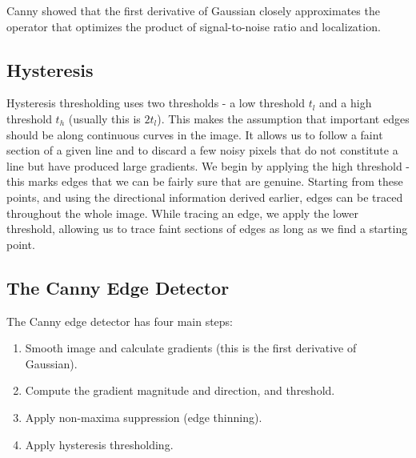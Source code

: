 \documentclass{article}
\begin{document}
	Canny showed that the first derivative of Gaussian closely approximates the operator that optimizes the product of signal-to-noise ratio and localization.

	\subsection{Hysteresis}
	Hysteresis thresholding uses two thresholds - a low threshold $t_{l}$ and a high threshold $t_{h}$ (usually this is $2t_{l}$). This makes the assumption that important edges should be along continuous curves in the image. It allows us to follow a faint section of a given line and to discard a few noisy pixels that do not constitute a line but have produced large gradients. We begin by applying the high threshold - this marks edges that we can be fairly sure that are genuine. Starting from these points, and using the directional information derived earlier, edges can be traced throughout the whole image. While tracing an edge, we apply the lower threshold, allowing us to trace faint sections of edges as long as we find a starting point.
	
	\subsection{The Canny Edge Detector}
	The Canny edge detector has four main steps:
	\begin{enumerate}
		\item Smooth image and calculate gradients (this is the first derivative of Gaussian).
		\item Compute the gradient magnitude and direction, and threshold.
		\item Apply non-maxima suppression (edge thinning).
		\item Apply hysteresis thresholding.
	\end{enumerate}
\end{document}
